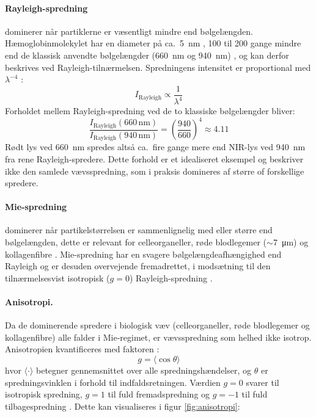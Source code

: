 \paragraph{Rayleigh-spredning} dominerer når partiklerne er væsentligt mindre end bølgelængden. Hæmoglobinmolekylet har en diameter på ca.\ \SI{5}{nm} \cite{Erickson2009}, 100 til 200 gange mindre end de klassisk anvendte bølgelængder (\SI{660}{nm} og \SI{940}{nm}) \cite{Webster1997}, og kan derfor beskrives ved Rayleigh-tilnærmelsen. Spredningens intensitet er proportional med $\lambda^{-4}$ \cite{Pedrotti2017}:
\begin{equation}
    I_{\text{Rayleigh}} \propto \frac{1}{\lambda^4}
    \label{eq:rayleigh_prop}
\end{equation}
Forholdet mellem Rayleigh-spredning ved de to klassiske 
bølgelængder bliver:
\begin{equation}
    \frac{I_{\text{Rayleigh}}(660\,\mathrm{nm})}{I_{\text{Rayleigh}}(940\,\mathrm{nm})} = 
    \left(\frac{940}{660}\right)^4 \approx 4.11
    \label{eq:rayleigh_ratio}
\end{equation}
Rødt lys ved \SI{660}{nm} spredes altså ca.\ fire gange mere 
end NIR-lys ved \SI{940}{nm} fra rene Rayleigh-spredere. Dette forhold er et idealiseret eksempel og beskriver ikke den samlede vævsspredning, som i praksis domineres af større of forskellige spredere.

\paragraph{Mie-spredning} dominerer når partikelstørrelsen er sammenlignelig med eller større end bølgelængden, dette er relevant for celleorganeller, røde blodlegemer ($\sim$\SI{7}{\micro\meter}) og kollagenfibre \cite{DiezSilva2010} \cite[s.~4-6]{Tuchin2015}. Mie-spredning har en svagere bølgelængdeafhængighed end Rayleigh og er desuden overvejende fremadrettet, i modsætning til den tilnærmelsesvist isotropisk ($g=0$) Rayleigh-spredning \cite[s. 13]{Tuchin2015}.

\paragraph{Anisotropi.} Da de dominerende spredere i biologisk væv (celleorganeller, røde blodlegemer og kollagenfibre) alle falder i Mie-regimet, er vævsspredning som helhed ikke isotrop. Anisotropien kvantificeres med faktoren \cite[s.~13]{Tuchin2015}:
\begin{equation}
    g = \langle \cos \theta \rangle
    \label{eq:anisotropy}
\end{equation}
hvor $\langle \cdot \rangle$ betegner gennemsnittet over 
alle spredningshændelser, og $\theta$ er spredningsvinklen 
i forhold til indfaldsretningen. Værdien $g = 0$ svarer til isotropisk spredning, $g = 1$ til fuld fremadspredning og $g = -1$ til fuld tilbagespredning \cite[s.~13]{Tuchin2015}. Dette kan visualiseres i figur \ref{fig:anisotropi}:

